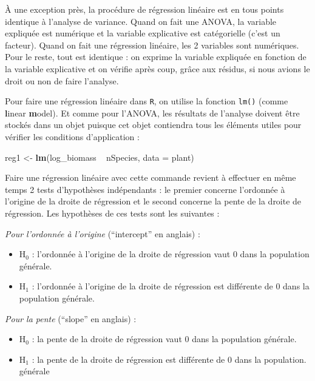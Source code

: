 \documentclass[
  a4paper,
]{article}
\newenvironment{Shaded}{\begin{snugshade}}{\end{snugshade}}
\newcommand{\DataTypeTok}[1]{\textcolor[rgb]{0.00,0.34,0.68}{#1}}
\newcommand{\KeywordTok}[1]{\textcolor[rgb]{0.12,0.11,0.11}{\textbf{#1}}}
\newcommand{\NormalTok}[1]{\textcolor[rgb]{0.12,0.11,0.11}{#1}}
\newcommand{\OperatorTok}[1]{\textcolor[rgb]{0.12,0.11,0.11}{#1}}
\newcommand{\StringTok}[1]{\textcolor[rgb]{0.75,0.01,0.01}{#1}}
\providecommand{\tightlist}{%
  \setlength{\itemsep}{0pt}\setlength{\parskip}{0pt}}
\begin{document}
À une exception près, la procédure de régression linéaire est en tous points identique à l'analyse de variance. Quand on fait une ANOVA, la variable expliquée est numérique et la variable explicative est catégorielle (c'est un facteur). Quand on fait une régression linéaire, les 2 variables sont numériques. Pour le reste, tout est identique : on exprime la variable expliquée en fonction de la variable explicative et on vérifie après coup, grâce aux résidus, si nous avions le droit ou non de faire l'analyse.

Pour faire une régression linéaire dans \texttt{R}, on utilise la fonction \texttt{lm()} (comme \textbf{l}inear \textbf{m}odel). Et comme pour l'ANOVA, les résultats de l'analyse doivent être stockés dans un objet puisque cet objet contiendra tous les éléments utiles pour vérifier les conditions d'application :

\begin{Shaded}
\begin{Highlighting}[]
\NormalTok{reg1 <-}\StringTok{ }\KeywordTok{lm}\NormalTok{(log_biomass }\OperatorTok{~}\StringTok{ }\NormalTok{nSpecies, }\DataTypeTok{data =}\NormalTok{ plant)}
\end{Highlighting}
\end{Shaded}

Faire une régression linéaire avec cette commande revient à effectuer en même temps 2 tests d'hypothèses indépendants : le premier concerne l'ordonnée à l'origine de la droite de régression et le second concerne la pente de la droite de régression. Les hypothèses de ces tests sont les suivantes :

\emph{Pour l'ordonnée à l'origine} (``intercept'' en anglais) :

\begin{itemize}
\tightlist
\item
  H\(_0\) : l'ordonnée à l'origine de la droite de régression vaut 0 dans la population générale.
\item
  H\(_1\) : l'ordonnée à l'origine de la droite de régression est différente de 0 dans la population générale.
\end{itemize}

\emph{Pour la pente} (``slope'' en anglais) :

\begin{itemize}
\tightlist
\item
  H\(_0\) : la pente de la droite de régression vaut 0 dans la population générale.
\item
  H\(_1\) : la pente de la droite de régression est différente de 0 dans la population. générale
\end{itemize}
\end{document}
